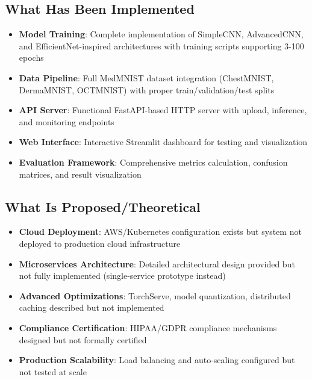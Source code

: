 \documentclass[12pt,a4paper]{article}
\begin{document}
\subsection*{What Has Been Implemented}
\begin{itemize}
    \item \textbf{Model Training}: Complete implementation of SimpleCNN, AdvancedCNN, and EfficientNet-inspired architectures with training scripts supporting 3-100 epochs
    \item \textbf{Data Pipeline}: Full MedMNIST dataset integration (ChestMNIST, DermaMNIST, OCTMNIST) with proper train/validation/test splits
    \item \textbf{API Server}: Functional FastAPI-based HTTP server with upload, inference, and monitoring endpoints
    \item \textbf{Web Interface}: Interactive Streamlit dashboard for testing and visualization
    \item \textbf{Evaluation Framework}: Comprehensive metrics calculation, confusion matrices, and result visualization
\end{itemize}

\subsection*{What Is Proposed/Theoretical}
\begin{itemize}
    \item \textbf{Cloud Deployment}: AWS/Kubernetes configuration exists but system not deployed to production cloud infrastructure
    \item \textbf{Microservices Architecture}: Detailed architectural design provided but not fully implemented (single-service prototype instead)
    \item \textbf{Advanced Optimizations}: TorchServe, model quantization, distributed caching described but not implemented
    \item \textbf{Compliance Certification}: HIPAA/GDPR compliance mechanisms designed but not formally certified
    \item \textbf{Production Scalability}: Load balancing and auto-scaling configured but not tested at scale
\end{itemize}
\end{document}
